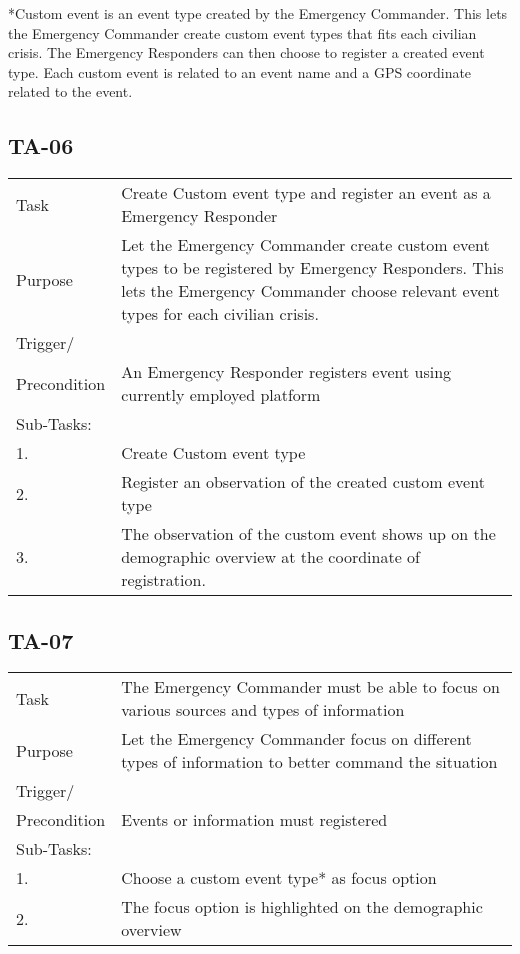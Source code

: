 *Custom event is an event type created by the Emergency Commander. This lets the Emergency Commander create custom event types that fits each civilian crisis. The Emergency Responders can then choose to register a created event type. Each custom event is related to an event name and a GPS coordinate related to the event.


\subsection{TA-06}
\begin{longtable}{| p{2.5cm}  | p{10cm} |  }
	\hline
	Task & Create Custom event type and register an event as a Emergency Responder \\
	Purpose & Let the Emergency Commander create custom event types to be registered by Emergency Responders. This lets the Emergency Commander choose relevant event types for each civilian crisis.  \\
	Trigger/ &  \\Precondition & An  Emergency Responder registers event using currently employed platform \\
	\hline
	Sub-Tasks: & \\
	1. & Create Custom event type \\
	2. & Register an observation of the created custom event type \\
	3. & The observation of the custom event shows up on the demographic overview at the coordinate of registration. \\
	\hline
\end{longtable}

\newpage
\subsection{TA-07}
\begin{longtable}{| p{2.5cm}  | p{10cm} |  }
	\hline
	Task & The Emergency Commander must be able to focus on various sources and types of information  \\
	Purpose & Let the Emergency Commander focus on different types of information to better command the situation \\
	Trigger/ &  \\ Precondition & Events or information must registered \\
	\hline
	Sub-Tasks: & \\
	1. & Choose a custom event type* as focus option \\
	2. & The focus option is highlighted on the demographic overview \\
	\hline
\end{longtable}

